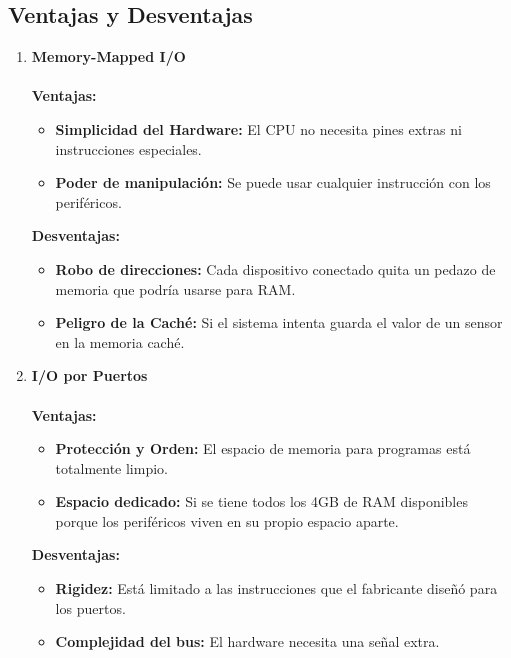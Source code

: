 \documentclass[]{article}
\begin{document}
	\subsection{Ventajas y Desventajas}
		\begin{enumerate}
			\item \textbf{Memory-Mapped I/O}\\\\
				\textbf{Ventajas:}
				\begin{itemize}
					\item \textbf{Simplicidad del Hardware:} El CPU no necesita pines extras ni instrucciones especiales.
					\item \textbf{Poder de manipulación:} Se puede usar cualquier instrucción con los periféricos.
				\end{itemize}
				\textbf{Desventajas:}
				\begin{itemize}
					\item \textbf{Robo de direcciones:} Cada dispositivo conectado quita un pedazo de memoria que podría usarse para RAM.
					\item \textbf{Peligro de la Caché:} Si el sistema intenta guarda el valor de un sensor en la memoria caché.
				\end{itemize}
			\item \textbf{I/O por Puertos}\\\\
			\textbf{Ventajas:}
			\begin{itemize}
				\item \textbf{Protección y Orden:} El espacio de memoria para programas está totalmente limpio.
				\item \textbf{Espacio dedicado:} Si se tiene todos los 4GB de RAM disponibles porque los periféricos viven en su propio espacio aparte.
			\end{itemize}
			\textbf{Desventajas:}
			\begin{itemize}
				\item \textbf{Rigidez:} Está limitado a las instrucciones que el fabricante diseñó para los puertos.
				\item \textbf{Complejidad del bus:} El hardware necesita una señal extra.
			\end{itemize}
				
				
		\end{enumerate}
		
\end{document}
